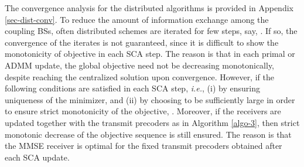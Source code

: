 
The convergence analysis for the distributed algorithms is provided in Appendix \ref{sec-dist-conv}. To reduce the amount of information exchange among the coupling \acp{BS}, often distributed schemes are iterated for few steps, say, . If so, the convergence of the iterates is not guaranteed, since it is difficult to show the monotonicity of objective in each \ac{SCA} step. The reason is that in each primal or \ac{ADMM} update, the global objective need not be decreasing monotonically, despite reaching the centralized solution upon convergence. However, if the following conditions are satisfied in each \ac{SCA} step, \textit{i.e.}, (i) by ensuring uniqueness of the minimizer, and (ii) by choosing  to be sufficiently large in order to ensure strict monotonicity of the objective, . Moreover, if the receivers are updated together with the transmit precoders as in Algorithm \ref{algo-3}, then strict monotonic decrease of the objective sequence is still ensured. The reason is that the \ac{MMSE} receiver is optimal for the fixed transmit precoders obtained after each \ac{SCA} update.
	
